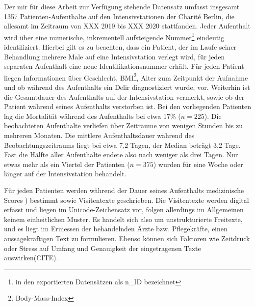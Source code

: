 Der mir für diese Arbeit zur Verfügung stehende Datensatz umfasst insgesamt 1357 Patienten-Aufenthalte auf den Intensivstationen der Charité Berlin, die allesamt im Zeitraum von XXX 2019 bis XXX 2020 stattfanden. Jeder Aufenthalt wird über eine numerische, inkrementell aufsteigende Nummer\footnote{in den exportierten Datensätzen als n\_ID bezeichnet} eindeutig identifiziert. Hierbei gilt es zu beachten, dass ein Patient, der im Laufe seiner Behandlung mehrere Male auf eine Intensivstation verlegt wird, für jeden separaten Aufenthalt eine neue Identifikationsnummer erhält. Für jeden Patient liegen Informationen über Geschlecht, BMI\footnote{Body-Mass-Index}, Alter zum Zeitpunkt der Aufnahme und ob während des Aufenthalts ein Delir diagnostiziert wurde, vor. Weiterhin ist die Gesamtdauer des Aufenthalts auf der Intensivstation vermerkt, sowie ob der Patient während seines Aufenthalts verstorben ist. Bei den vorliegenden Patienten lag die Mortalität während des Aufenthalts bei etwa 17\% ($n=225$). Die beobachteten Aufenthalte verliefen über Zeiträume von wenigen Stunden bis zu mehreren Monaten. Die mittlere Aufenthaltsdauer während des Beobachtungszeitraums liegt bei etwa 7,2 Tagen, der Median beträgt 3,2 Tage. Fast die Hälfte aller Aufenthalte endete also nach weniger als drei Tagen. Nur etwas mehr als ein Viertel der Patienten ($n=375$) wurden für eine Woche oder länger auf der Intensivstation behandelt.

Für jeden Patienten werden während der Dauer seines Aufenthalts medizinische Scores ) bestimmt sowie Visitentexte geschrieben. Die Visitentexte werden digital erfasst und liegen im Unicode-Zeichensatz vor, folgen allerdings im Allgemeinen keinem einheitlichen Muster. Es handelt sich also um unstrukturierte Freitexte, und es liegt im Ermessen der behandelnden Ärzte bzw. Pflegekräfte, einen aussagekräftigen Text zu formulieren. Ebenso können sich Faktoren wie Zeitdruck oder Stress auf Umfang und Genauigkeit der eingetragenen Texte auswirken(CITE).

